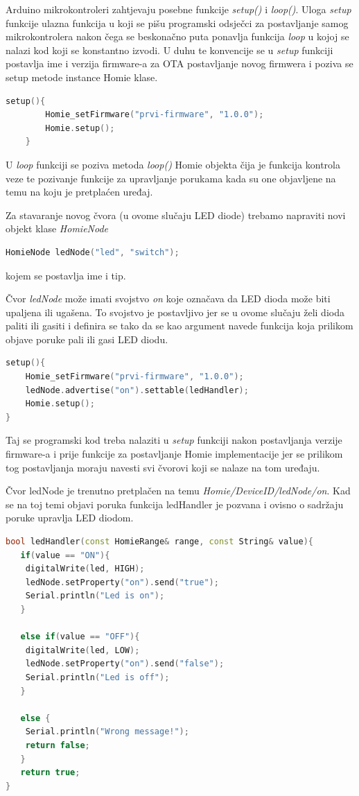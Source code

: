 \documentclass[times, utf8, zavrsni]{fer}
\begin{document}
Arduino mikrokontroleri zahtjevaju posebne funkcije \textit{setup()} i \textit{loop()}.
Uloga \textit{setup} funkcije ulazna funkcija u koji se pišu programski odsječci za postavljanje samog mikrokontrolera nakon čega se beskonačno puta ponavlja funkcija \textit{loop} u kojoj se nalazi kod koji se konstantno izvodi.
U duhu te konvencije se u \textit{setup} funkciji postavlja ime i verzija firmware-a za OTA postavljanje novog firmwera i poziva se setup metode instance Homie klase.
\begin{lstlisting}[language=c++]
    setup(){
        Homie_setFirmware("prvi-firmware", "1.0.0");
        Homie.setup();
    }
\end{lstlisting}

U \textit{loop} funkciji se poziva metoda \textit{loop()} Homie objekta čija je funkcija kontrola veze te pozivanje funkcije za upravljanje porukama kada su one objavljene na temu na koju je pretplaćen uređaj.

Za stavaranje novog čvora (u ovome slučaju LED diode) trebamo napraviti novi objekt klase \textit{HomieNode}
\begin{lstlisting}[language=c++]
HomieNode ledNode("led", "switch");
\end{lstlisting}
kojem se postavlja ime i tip.

Čvor \textit{ledNode} može imati svojstvo \textit{on} koje označava da LED dioda može biti upaljena ili ugašena.
To svojstvo je postavljivo jer se u ovome slučaju želi dioda paliti ili gasiti i definira se tako da se kao argument navede funkcija koja prilikom objave poruke pali ili gasi LED diodu.
\begin{lstlisting}[language=c++]
setup(){
    Homie_setFirmware("prvi-firmware", "1.0.0");
    ledNode.advertise("on").settable(ledHandler);
    Homie.setup();
}
\end{lstlisting}

Taj se programski kod treba nalaziti u \textit{setup} funkciji nakon postavljanja verzije firmware-a i prije funkcije za postavljanje Homie implementacije jer se prilikom tog postavljanja moraju navesti svi čvorovi koji se nalaze na tom uređaju.

Čvor ledNode je trenutno pretplačen na temu \textit{Homie/DeviceID/ledNode/on}.
Kad se na toj temi objavi poruka funkcija ledHandler je pozvana i ovisno o sadržaju poruke upravlja LED diodom.
\begin{lstlisting}[language=C++]
bool ledHandler(const HomieRange& range, const String& value){
   if(value == "ON"){
    digitalWrite(led, HIGH);
    ledNode.setProperty("on").send("true");
    Serial.println("Led is on");
   }

   else if(value == "OFF"){
    digitalWrite(led, LOW);
    ledNode.setProperty("on").send("false");
    Serial.println("Led is off");
   }

   else {
    Serial.println("Wrong message!");
    return false;
   }
   return true;
}
\end{lstlisting}
\end{document}
